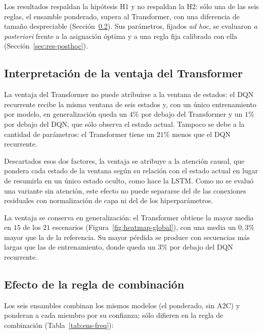 \documentclass[../00_Main/Main.tex]{subfiles}
\begin{document}
\label{sec:discussion}

Los resultados respaldan la hip\'otesis H1 y no respaldan la H2: s\'olo
una de las seis reglas, el ensamble ponderado, supera al Transformer, con
una diferencia de tama\~no despreciable (Secci\'on~\ref{sec:ens-best}).
Sus par\'ametros, fijados \emph{ad hoc}, se evaluaron \emph{a posteriori} frente a
la asignaci\'on \'optima y a una regla fija calibrada con ella
(Secci\'on~\ref{sec:res-posthoc}).

\subsection{Interpretaci\'on de la ventaja del Transformer}\label{sec:disc-individual}

La ventaja del Transformer no puede atribuirse a la ventana de estados: el
DQN recurrente recibe la misma ventana de seis estados y, con un \'unico
entrenamiento por modelo, en generalizaci\'on queda un $4\%$ por debajo
del Transformer y un
$1\%$ por debajo del DQN, que s\'olo observa el estado actual. Tampoco se
debe a la cantidad de par\'ametros: el Transformer tiene un $21\%$ menos
que el DQN recurrente.

Descartados esos dos factores, la ventaja se atribuye a la atenci\'on
causal, que pondera cada estado de la ventana seg\'un su relaci\'on con el
estado actual en lugar de resumirla en un \'unico estado oculto, como hace
la LSTM. Como no se evalu\'o una variante sin atenci\'on, este efecto no
puede separarse del de las conexiones residuales con normalizaci\'on de
capa ni del de los hiperpar\'ametros.

La ventaja se conserva en generalizaci\'on: el Transformer obtiene la
mayor media en $15$ de los $21$ escenarios
(Figura~\ref{fig:heatmap-global}), con una media un $0{,}3\%$ mayor que
la de la referencia. Su mayor p\'erdida se produce con secuencias m\'as
largas que las de entrenamiento, donde queda un $3\%$ por
debajo del DQN recurrente.

\subsection{Efecto de la regla de combinaci\'on}\label{sec:ens-best}

Los seis ensambles combinan los mismos modelos (el ponderado, sin A2C) y ponderan a cada miembro
por su confianza; s\'olo difieren en la regla de combinaci\'on
(Tabla~\ref{tab:ens-freq}):
\end{document}

